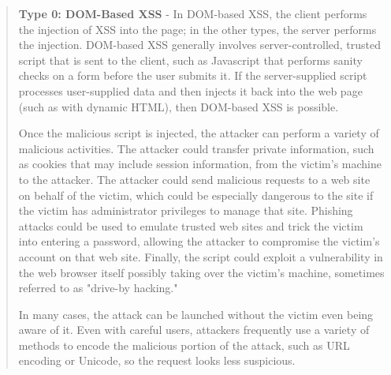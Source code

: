 \begin{quote}
	\textbf{Type 0: DOM-Based XSS} - In DOM-based XSS, the client performs the injection of XSS into the page; in the other types, the server performs the injection. DOM-based XSS generally involves server-controlled, trusted script that is sent to the client, such as Javascript that performs sanity checks on a form before the user submits it. If the server-supplied script processes user-supplied data and then injects it back into the web page (such as with dynamic HTML), then DOM-based XSS is possible.

	Once the malicious script is injected, the attacker can perform a variety of malicious activities. The attacker could transfer private information, such as cookies that may include session information, from the victim's machine to the attacker. The attacker could send malicious requests to a web site on behalf of the victim, which could be especially dangerous to the site if the victim has administrator privileges to manage that site. Phishing attacks could be used to emulate trusted web sites and trick the victim into entering a password, allowing the attacker to compromise the victim's account on that web site. Finally, the script could exploit a vulnerability in the web browser itself possibly taking over the victim's machine, sometimes referred to as "drive-by hacking."

	In many cases, the attack can be launched without the victim even being aware of it. Even with careful users, attackers frequently use a variety of methods to encode the malicious portion of the attack, such as URL encoding or Unicode, so the request looks less suspicious. \cite{mitre/XSS}
\end{quote}
